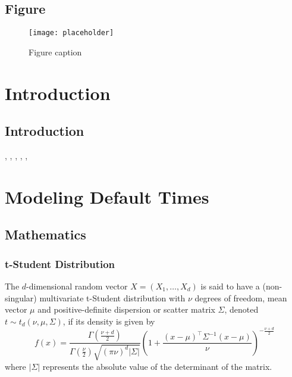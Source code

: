 \documentclass[11pt,fleqn]{book} %
\begin{document}

\section{Figure}

\begin{figure}[h]
\centering\texttt{[image: placeholder]}
\caption{Figure caption}
\end{figure}


\chapter{Introduction}
\section{Introduction}
\cite{mcneil:2005}, \cite{sklar:1959}, \cite{li:2000}, 
\cite{roncalli:2001}, \cite{embrechts:2002}, \cite{cmetrics:1997}

\chapter{Modeling Default Times}

\section{Mathematics}

\subsection{t-Student Distribution}

\begin{definition}
The $d$-dimensional random vector $X=(X_1,\dots,X_d)$ is said to have a 
(non-singular) multivariate t-Student distribution with $\nu$ degrees of freedom, 
mean vector $\mu$ and positive-definite dispersion or scatter matrix $\Sigma$, 
denoted $t \sim t_d(\nu,\mu,\Sigma)$, if its density is given by
\begin{displaymath}
f(x)=\frac{\Gamma\left(\frac{\nu+d}{2}\right)}{\Gamma\left(\frac{\nu}{2}\right)\sqrt{(\pi \nu)^d |\Sigma|}}
\left(
1+ \frac{(x-\mu)^\top\Sigma^{-1}(x-\mu)}{\nu}
\right)^{-\frac{\nu+d}{2}}
\end{displaymath}
\noindent where $|\Sigma|$ represents the absolute value of the determinant of the matrix. 
\end{definition}
\end{document}
